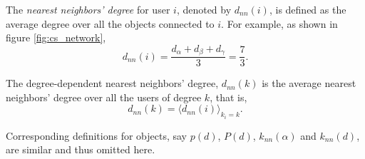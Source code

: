       The \emph{nearest neighbors’ degree} for user $i$, denoted by $d_{nn}(i)$, is defined as the average degree over all the objects connected to $i$. For example, as shown in figure \ref{fig:cs_network},
      \begin{equation}
        d_{nn}(i) = \frac{d_\alpha + d_\beta + d_\gamma}{3} = \frac{7}{3}\mbox{.}
      \end{equation}

      The degree-dependent nearest neighbors’ degree, $d_{nn}(k)$ is the average nearest neighbors’ degree over all the users of degree $k$, that is,
      \begin{equation}
        d_{nn}(k) = \langle d_{nn}(i) \rangle_{k_i=k}\mbox{.}
      \end{equation}

      Corresponding definitions for objects, say $p(d)$, $P(d)$, $k_{nn}(\alpha)$ and $k_{nn}(d)$, are similar and thus omitted here.
      
